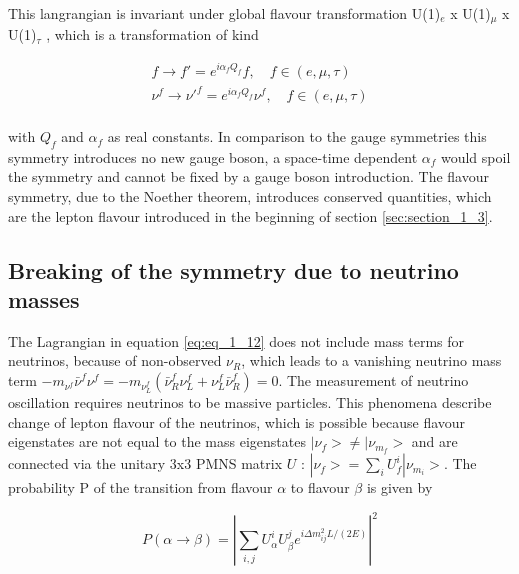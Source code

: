 This langrangian is invariant under global flavour transformation U(1)$_{e}$ x U(1)$_{\mu}$ x U(1)$_{\tau}$ \cite{LFV1, LFV2}, which is a transformation of kind 

\begin{equation}
	\label{eq:eq_1_13}
	\begin{split}
		f \rightarrow f' = e^{i\alpha_{f}Q_{f}}f, \quad f \in (e, \mu, \tau) \\
		\nu^{f} \rightarrow \nu'^{f} = e^{i\alpha_{f}Q_{f}}\nu^{f}, \quad f \in (e, \mu, \tau) \\
	\end{split}
\end{equation}

with $Q_{f}$ and $\alpha_{f}$ as real constants. In comparison to the gauge symmetries this symmetry introduces no new gauge boson, a space-time dependent $\alpha_{f}$ would spoil the symmetry and cannot be fixed by a gauge boson introduction. The flavour symmetry, due to the Noether theorem, introduces conserved quantities, which are the lepton flavour introduced in the beginning of section \ref{sec:section_1_3}.


\subsection{Breaking of the symmetry due to neutrino masses}
\label{sec:section_1_3_2}

The Lagrangian in equation \ref{eq:eq_1_12} does not include mass terms for neutrinos, because of non-observed $\nu_R$, which leads to a vanishing neutrino mass term $-m_{\nu^{f}}\bar{\nu}^{f}\nu^{f} = -m_{\nu^{f}_{L}}(\bar{\nu}^{f}_{R}\nu^{f}_{L} + {\nu}^{f}_{L}\bar{\nu}^{f}_{R}) = 0$. The measurement of neutrino oscillation \cite{NEUTRINOOSC} requires neutrinos to be massive particles. This phenomena describe change of lepton flavour of the neutrinos, which is possible because flavour eigenstates are not equal to the mass eigenstates $|\nu_{f}> \neq |\nu_{m_{f}}>$ and are connected via the unitary 3x3 PMNS matrix $U$ \cite{PMNS}: $|\nu_{f}> =  \sum_{i} U^{i}_{f}|\nu_{m_{i}}>$. The probability P of the transition from flavour $\alpha$ to flavour $\beta$ \cite{NEUTRINOPROB} is given by 

\begin{equation}
	\label{eq:eq_1_14}
	P(\alpha \rightarrow \beta) = |\sum_{i, j} U_{\alpha}^{i} U_{\beta}^{j} e^{i\Delta m^2_{ij}L/(2E)}|^2
\end{equation}


